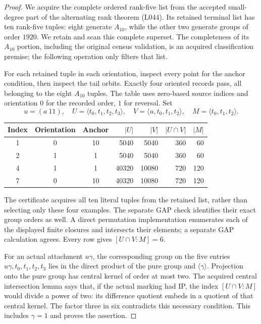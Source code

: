 \documentclass[11pt,a4paper]{article}
\newcommand{\gen}[1]{\langle#1\rangle}
\begin{document}
\begin{proof}
We acquire the complete ordered rank-five list from the accepted
small-degree part of the alternating rank theorem (L044). Its retained terminal list has ten rank-five tuples: eight generate
$A_{10}$, while the other two generate groups of order $1920$.
We retain and scan this complete superset. The completeness of its
$A_{10}$ portion, including the original census validation, is an
acquired classification premise; the following operation only filters
that list.

For each retained tuple in each orientation, inspect every point
for the anchor condition, then inspect the tail orbits. Exactly four
oriented records pass, all belonging to the eight $A_{10}$ tuples. The table uses zero-based source indices and
orientation $0$ for the recorded order, $1$ for reversal. Set
\[
 u=(a\ 11),\quad U=\gen{t_0,t_1,t_2,t_3},\quad
 V=\gen{u,t_0,t_1,t_2},\quad M=\gen{t_0,t_1,t_2}.
\]
\begin{center}
\begin{tabular}{ccc rrrr}
\toprule
Index&Orientation&Anchor&$|U|$&$|V|$&$|U\cap V|$&$|M|$\\
\midrule
1&0&10&5040&5040&360&60\\
2&1&1&5040&5040&360&60\\
4&1&1&40320&10080&720&120\\
7&0&10&40320&10080&720&120\\
\bottomrule
\end{tabular}
\end{center}
The certificate acquires all ten literal tuples from the retained
list, rather than selecting only these four examples. The separate
GAP check identifies their exact group orders as well. A direct
permutation implementation enumerates each of the displayed finite
closures and intersects their elements; a separate GAP calculation
agrees. Every row gives $[U\cap V:M]=6$.

For an actual attachment $u\gamma$, the corresponding group on the
five entries $u\gamma,t_0,t_1,t_2,t_3$ lies in the direct product
of the pure group and $\gen\gamma$. Projection onto the pure group
has central kernel of order at most two. The acquired central
intersection lemma says that, if the actual marking had IP, the
index $[U\cap V:M]$ would divide a power of two: its difference
quotient embeds in a quotient of that central kernel. The factor
three in six contradicts this necessary condition. This includes
$\gamma=1$ and proves the assertion.
\end{proof}
\end{document}
